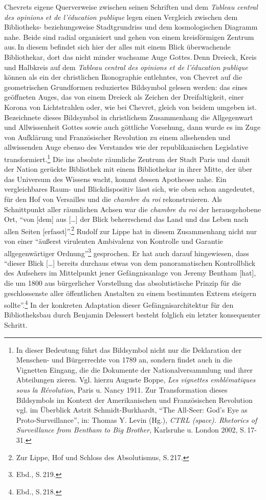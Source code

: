 Chevrets eigene Querverweise zwischen seinen Schriften und dem
\emph{Tableau central des opinions et de l'éducation publique} legen
einen Vergleich zwischen dem Bibliotheks- beziehungsweise Stadtgrundriss
und dem kosmologischen Diagramm nahe. Beide sind radial organisiert und
gehen von einem kreisförmigen Zentrum aus.\,In diesem befindet sich hier
der alles mit einem Blick überwachende Bibliothekar, dort das nicht
minder wachsame Auge Gottes.\,Denn Dreieck, Kreis und Halbkreis auf dem
\emph{Tableau central des opinions et de l'éducation publique} können
als ein der christlichen Ikonographie entlehntes, von Chevret auf die
geometrischen Grundformen reduziertes Bildsymbol gelesen werden: das
eines geöffneten Auges, das von einem Dreieck als Zeichen der
Dreifaltigkeit, einer Korona von Lichtstrahlen oder, wie bei Chevret,
gleich von beidem umgeben ist. Bezeichnete dieses Bildsymbol in
christlichem Zusammenhang die Allgegenwart und Allwissenheit Gottes
sowie auch göttliche Vorsehung, dann wurde es im Zuge von Aufklärung und
Französischer Revolution zu einem allsehenden und allwissenden Auge
ebenso des Verstandes wie der republikanischen Legislative
transformiert.\footnote{In dieser Bedeutung führt das Bildsymbol nicht
  nur die Deklaration der Menschen- und Bürgerrechte von 1789 an,
  sondern findet auch in die Vignetten Eingang, die die Dokumente der
  Nationalversammlung und ihrer Abteilungen zieren. Vgl. hierzu Auguste
  Boppe, \emph{Les vignettes emblématiques sous la Révolution}, Paris u.
  Nancy 1911. Zur Transformation dieses Bildsymbols im Kontext der
  Amerikanischen und Französischen Revolution vgl. im Überblick Astrit
  Schmidt-Burkhardt, \enquote{The All-Seer: God's Eye as
  Proto-Surveillance}, in: Thomas Y. Levin (Hg.), \emph{CTRL (space).
  Rhetorics of Surveillance from Bentham to Big Brother}, Karlsruhe u.
  London 2002, S.\,17-31.} Die ins absolute räumliche Zentrum der Stadt
Paris und damit der Nation gerückte Bibliothek mit einem Bibliothekar in
ihrer Mitte, der über das Universum des Wissens wacht, kommt dessen
Apotheose nahe. Ein vergleichbares Raum- und Blickdispositiv lässt sich,
wie oben schon angedeutet, für den Hof von Versailles und die
\emph{chambre du roi} rekonstruieren. Als Schnittpunkt aller räumlichen
Achsen war die \emph{chambre du roi} der herausgehobene Ort,
\enquote{von {[}dem{]} aus {[}\ldots{}{]} der Blick beherrschend das
Land und das Leben nach allen Seiten {[}erfasst{]}}.\footnote{Zur Lippe,
  Hof und Schloss des Absolutismus, S.\,217.} Rudolf zur Lippe hat in
diesem Zusammenhang nicht nur von einer \enquote{äußerst virulenten
Ambivalenz von Kontrolle und Garantie allgegenwärtiger
Ordnung}\footnote{Ebd., S.\,219.} gesprochen. Er hat auch darauf
hingewiesen, dass \enquote{dieser Blick {[}\ldots{}{]} bereits durchaus
etwas von dem panoramatischen Kontrollblick des Aufsehers im Mittelpunkt
jener Gefängnisanlage von Jeremy Bentham {[}hat{]}, die um 1800 aus
bürgerlicher Vorstellung das absolutistische Prinzip für die
geschlossenste aller öffentlichen Anstalten zu einem bestimmten Extrem
steigern sollte}.\footnote{Ebd., S.\,218.} In der konkreten Adaptation
dieser Gefängnisarchitektur für den Bibliotheksbau durch Benjamin
Delessert besteht folglich ein letzter konsequenter Schritt.

